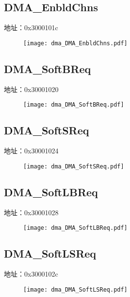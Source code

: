 \subsection{DMA\_EnbldChns}
\label{dma-DMA-EnbldChns}
地址：0x3000101c
 \begin{figure}[H]
\texttt{[image: dma\_DMA\_EnbldChns.pdf]}
\end{figure}

\subsection{DMA\_SoftBReq}
\label{dma-DMA-SoftBReq}
地址：0x30001020
 \begin{figure}[H]
\texttt{[image: dma\_DMA\_SoftBReq.pdf]}
\end{figure}

\subsection{DMA\_SoftSReq}
\label{dma-DMA-SoftSReq}
地址：0x30001024
 \begin{figure}[H]
\texttt{[image: dma\_DMA\_SoftSReq.pdf]}
\end{figure}

\subsection{DMA\_SoftLBReq}
\label{dma-DMA-SoftLBReq}
地址：0x30001028
 \begin{figure}[H]
\texttt{[image: dma\_DMA\_SoftLBReq.pdf]}
\end{figure}

\subsection{DMA\_SoftLSReq}
\label{dma-DMA-SoftLSReq}
地址：0x3000102c
 \begin{figure}[H]
\texttt{[image: dma\_DMA\_SoftLSReq.pdf]}
\end{figure}

